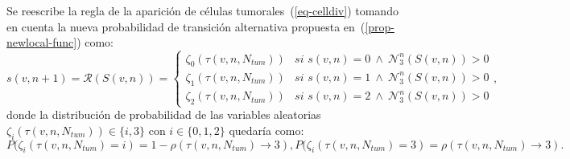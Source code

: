 Se reescribe la regla de la aparici\'on de c\'elulas tumorales~(\ref{eq-celldiv}) tomando en cuenta la nueva probabilidad de transici\'on alternativa propuesta en~(\ref{prop-newlocal-func}) como:
\begin{equation}
s(v,n+1)=\mathcal{R}(S(v,n))=\left\lbrace
	\begin{array}{ll}
		\zeta_0(\tau(v,n,N_{tum}))& \textit{si } s(v,n)=0~\wedge~\mathcal{N}_3^n(S(v,n)) > 0 \\
		\zeta_1(\tau(v,n,N_{tum}))& \textit{si } s(v,n)=1~\wedge~\mathcal{N}_3^n(S(v,n)) > 0 \\
		\zeta_2(\tau(v,n,N_{tum}))& \textit{si } s(v,n)=2~\wedge~\mathcal{N}_3^n(S(v,n)) > 0 
	\end{array}
\right., \label{eq-celldiv-2}
\end{equation}
donde la distribuci\'on de probabilidad de las variables aleatorias $\zeta_i(\tau(v,n,N_{tum})) \in \lbrace i,3 \rbrace$ con $i \in \lbrace 0,1,2 \rbrace$ quedar\'ia como:
\begin{subequations}
\begin{equation}
P(\zeta_i(\tau(v,n,N_{tum})=i) = 1 - \rho(\tau(v,n,N_{tum}) \rightarrow 3),
\end{equation}
\begin{equation}
P(\zeta_i(\tau(v,n,N_{tum})=3) = \rho(\tau(v,n,N_{tum}) \rightarrow 3).
\end{equation}
\end{subequations}

